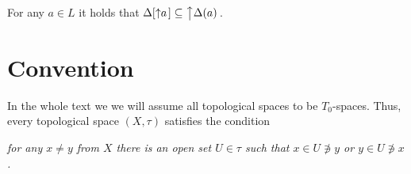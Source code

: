 \begin{cor} \label{cor:delta-of-upsets}
  For any $a\in L$ it holds that $\Delta[ \left\uparrow a\right. ] \subseteq
  \left\uparrow \Delta(a)\right.$.
\end{cor}

\section*{Convention}

In the whole text we we will assume all topological spaces to be $T_0$-spaces.
Thus, every topological space $(X, \tau)$ satisfies the condition
\begin{center} \it
  for any $x \ne y$ from $X$ there is an open set $U \in \tau$ such that $x \in
  U \not\owns y$ or $y \in U \not\owns x$.
\end{center}
